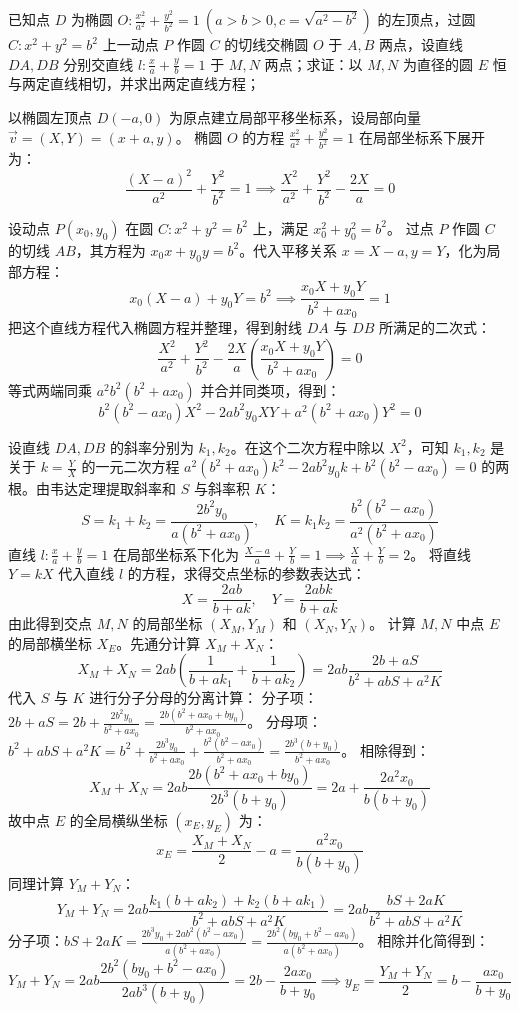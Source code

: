 \begin{exercise}
已知点 \(D\) 为椭圆 \(O: \frac{x^2}{a^2} + \frac{y^2}{b^2} = 1\ (a > b > 0, c = \sqrt{a^2 - b^2})\) 的左顶点，过圆 \(C: x^2 + y^2 = b^2\) 上一动点 \(P\) 作圆 \(C\) 的切线交椭圆 \(O\) 于 \(A,B\) 两点，设直线 \(DA, DB\) 分别交直线 \(l: \frac{x}{a} + \frac{y}{b} = 1\) 于 \(M,N\) 两点；求证：以 \(M,N\) 为直径的圆 \(E\) 恒与两定直线相切，并求出两定直线方程；
\end{exercise}
\begin{solution}
以椭圆左顶点 $D(-a, 0)$ 为原点建立局部平移坐标系，设局部向量 $\vec{v} = (X, Y) = (x+a, y)$。
椭圆 $O$ 的方程 $\frac{x^2}{a^2} + \frac{y^2}{b^2} = 1$ 在局部坐标系下展开为：
$$ \frac{(X-a)^2}{a^2} + \frac{Y^2}{b^2} = 1 \implies \frac{X^2}{a^2} + \frac{Y^2}{b^2} - \frac{2X}{a} = 0 $$

设动点 $P(x_0, y_0)$ 在圆 $C: x^2 + y^2 = b^2$ 上，满足 $x_0^2 + y_0^2 = b^2$。
过点 $P$ 作圆 $C$ 的切线 $AB$，其方程为 $x_0 x + y_0 y = b^2$。代入平移关系 $x = X-a, y = Y$，化为局部方程：
$$ x_0(X-a) + y_0 Y = b^2 \implies \frac{x_0 X + y_0 Y}{b^2 + a x_0} = 1 $$
把这个直线方程代入椭圆方程并整理，得到射线 $DA$ 与 $DB$ 所满足的二次式：
$$ \frac{X^2}{a^2} + \frac{Y^2}{b^2} - \frac{2X}{a} \left( \frac{x_0 X + y_0 Y}{b^2 + a x_0} \right) = 0 $$
等式两端同乘 $a^2 b^2 (b^2 + a x_0)$ 并合并同类项，得到：
$$ b^2(b^2 - a x_0) X^2 - 2ab^2 y_0 XY + a^2(b^2 + a x_0) Y^2 = 0 $$

设直线 $DA, DB$ 的斜率分别为 $k_1, k_2$。在这个二次方程中除以 $X^2$，可知 $k_1, k_2$ 是关于 $k = \frac{Y}{X}$ 的一元二次方程 $a^2(b^2 + a x_0) k^2 - 2ab^2 y_0 k + b^2(b^2 - a x_0) = 0$ 的两根。由韦达定理提取斜率和 $S$ 与斜率积 $K$：
$$ S = k_1 + k_2 = \frac{2b^2 y_0}{a(b^2 + a x_0)}, \quad K = k_1 k_2 = \frac{b^2(b^2 - a x_0)}{a^2(b^2 + a x_0)} $$
直线 $l: \frac{x}{a} + \frac{y}{b} = 1$ 在局部坐标系下化为 $\frac{X-a}{a} + \frac{Y}{b} = 1 \implies \frac{X}{a} + \frac{Y}{b} = 2$。
将直线 $Y = k X$ 代入直线 $l$ 的方程，求得交点坐标的参数表达式：
$$ X = \frac{2ab}{b + ak}, \quad Y = \frac{2abk}{b + ak} $$
由此得到交点 $M, N$ 的局部坐标 $(X_M, Y_M)$ 和 $(X_N, Y_N)$。
计算 $M, N$ 中点 $E$ 的局部横坐标 $X_E$。先通分计算 $X_M + X_N$：
$$ X_M + X_N = 2ab \left( \frac{1}{b+ak_1} + \frac{1}{b+ak_2} \right) = 2ab \frac{2b + aS}{b^2 + abS + a^2 K} $$
代入 $S$ 与 $K$ 进行分子分母的分离计算：
分子项：$2b + aS = 2b + \frac{2b^2 y_0}{b^2 + a x_0} = \frac{2b(b^2 + a x_0 + b y_0)}{b^2 + a x_0}$。
分母项：$b^2 + abS + a^2 K = b^2 + \frac{2b^3 y_0}{b^2 + a x_0} + \frac{b^2(b^2 - a x_0)}{b^2 + a x_0} = \frac{2b^3(b + y_0)}{b^2 + a x_0}$。
相除得到：
$$ X_M + X_N = 2ab \frac{2b(b^2 + a x_0 + b y_0)}{2b^3(b + y_0)} = 2a + \frac{2a^2 x_0}{b(b + y_0)} $$
故中点 $E$ 的全局横纵坐标 $(x_E, y_E)$ 为：
$$ x_E = \frac{X_M + X_N}{2} - a = \frac{a^2 x_0}{b(b + y_0)} $$
同理计算 $Y_M + Y_N$：
$$ Y_M + Y_N = 2ab \frac{k_1(b+ak_2) + k_2(b+ak_1)}{b^2 + abS + a^2 K} = 2ab \frac{bS + 2aK}{b^2 + abS + a^2 K} $$
分子项：$bS + 2aK = \frac{2b^3 y_0 + 2ab^2(b^2 - a x_0)}{a(b^2 + a x_0)} = \frac{2b^2(b y_0 + b^2 - a x_0)}{a(b^2 + a x_0)}$。
相除并化简得到：
$$ Y_M + Y_N = 2ab \frac{2b^2(b y_0 + b^2 - a x_0)}{2ab^3(b + y_0)} = 2b - \frac{2a x_0}{b + y_0} \implies y_E = \frac{Y_M + Y_N}{2} = b - \frac{a x_0}{b + y_0} $$




\end{solution}
